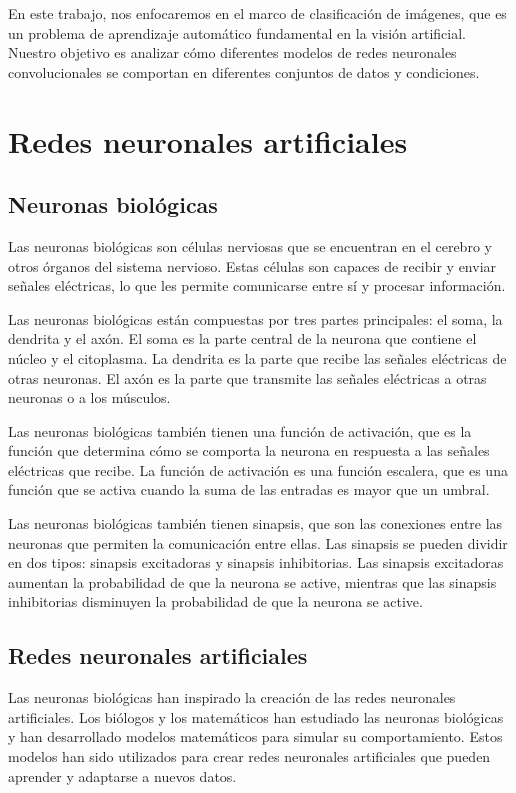 En este trabajo, nos enfocaremos en el marco de clasificación de imágenes, que es un problema de aprendizaje automático fundamental en la visión artificial. Nuestro objetivo es analizar cómo diferentes modelos de redes neuronales convolucionales se comportan en diferentes conjuntos de datos y condiciones.

\section{Redes neuronales artificiales}

\subsection{Neuronas biológicas}

Las neuronas biológicas son células nerviosas que se encuentran en el cerebro y otros órganos del sistema nervioso. Estas células son capaces de recibir y enviar señales eléctricas, lo que les permite comunicarse entre sí y procesar información.

Las neuronas biológicas están compuestas por tres partes principales: el soma, la dendrita y el axón. El soma es la parte central de la neurona que contiene el núcleo y el citoplasma. La dendrita es la parte que recibe las señales eléctricas de otras neuronas. El axón es la parte que transmite las señales eléctricas a otras neuronas o a los músculos.

Las neuronas biológicas también tienen una función de activación, que es la función que determina cómo se comporta la neurona en respuesta a las señales eléctricas que recibe. La función de activación es una función escalera, que es una función que se activa cuando la suma de las entradas es mayor que un umbral.

Las neuronas biológicas también tienen sinapsis, que son las conexiones entre las neuronas que permiten la comunicación entre ellas. Las sinapsis se pueden dividir en dos tipos: sinapsis excitadoras y sinapsis inhibitorias. Las sinapsis excitadoras aumentan la probabilidad de que la neurona se active, mientras que las sinapsis inhibitorias disminuyen la probabilidad de que la neurona se active.

\subsection{Redes neuronales artificiales}

Las neuronas biológicas han inspirado la creación de las redes neuronales artificiales. Los biólogos y los matemáticos han estudiado las neuronas biológicas y han desarrollado modelos matemáticos para simular su comportamiento. Estos modelos han sido utilizados para crear redes neuronales artificiales que pueden aprender y adaptarse a nuevos datos.

